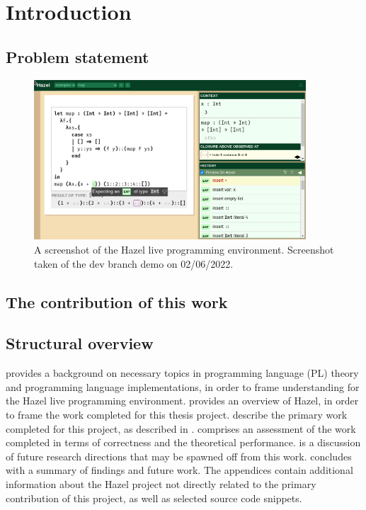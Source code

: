 \section{Introduction}
\label{sec:introduction}

\subsection{Problem statement}
\label{sec:prob_stmt}

\begin{figure}
  \centering
  \includegraphics[width=4in]{img/hazel_ui.png}
  \caption[Screenshot of the Hazel live programming environment.]{A screenshot of the Hazel live programming environment. Screenshot taken of the dev branch demo\footnotemark{} on 02/06/2022.}
  \label{fig:screenshot-hazel-ui}
\end{figure}


\subsection{The contribution of this work}
\label{sec:contribution}

\subsection{Structural overview}
\label{sec:structural_overview}

 provides a background on necessary topics in programming language (PL) theory and programming language implementations, in order to frame understanding for the Hazel live programming environment.  provides an overview of Hazel, in order to frame the work completed for this thesis project.  describe the primary work completed for this project, as described in .  comprises an assessment of the work completed in terms of correctness and the theoretical performance.  is a discussion of future research directions that may be spawned off from this work.  concludes with a summary of findings and future work. The appendices contain additional information about the Hazel project not directly related to the primary contribution of this project, as well as selected source code snippets.

